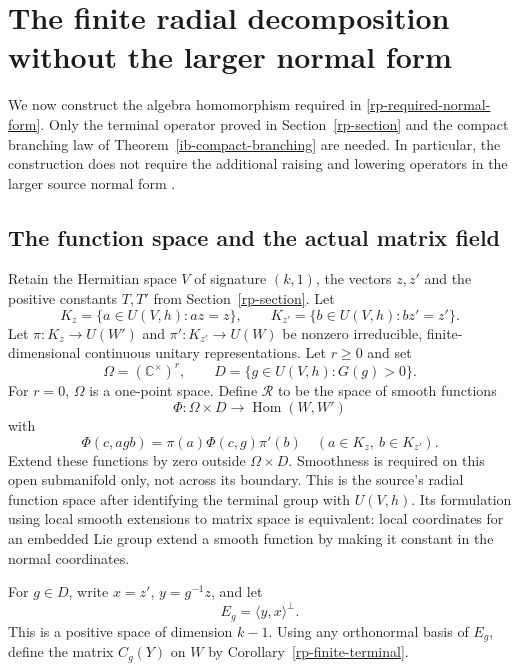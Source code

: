 \section{The finite radial decomposition without the larger normal form}
\label{rd-section}

We now construct the algebra homomorphism required in
\eqref{rp-required-normal-form}.  Only the terminal
operator proved in Section~\ref{rp-section} and the
compact branching law of Theorem~\ref{ib-compact-branching}
are needed.  In particular, the construction does not
require the additional raising and lowering operators
in the larger source normal form
\cite{alpo-uniform-source}.

\subsection{The function space and the actual matrix field}

Retain the Hermitian space $V$ of signature $(k,1)$,
the vectors $z,z'$ and the positive constants $T,T'$
from Section~\ref{rp-section}.  Let
\[
 K_z=\{a\in U(V,h):az=z\},\qquad
 K_{z'}=\{b\in U(V,h):bz'=z'\}.
\]
Let $\pi:K_z\to U(W')$ and
$\pi':K_{z'}\to U(W)$ be nonzero irreducible,
finite-dimensional continuous unitary representations.
Let $r\geq0$ and set
\[
 \Omega=(\mathbb C^\times)^r,\qquad
 D=\{g\in U(V,h):G(g)>0\}.
\]
For $r=0$, $\Omega$ is a one-point space.
Define $\mathscr R$ to be the space of smooth functions
\[
 \Phi:\Omega\times D\longrightarrow\operatorname{Hom}(W,W')
\]
with
\begin{equation}\label{rd-biequivariance}
 \Phi(c,agb)=\pi(a)\Phi(c,g)\pi'(b)
              \quad(a\in K_z,\ b\in K_{z'}).
\end{equation}
Extend these functions by zero outside $\Omega\times D$.
Smoothness is required on this open submanifold only,
not across its boundary.  This is the source's radial
function space after identifying the terminal group
with $U(V,h)$.  Its formulation using local smooth
extensions to matrix space is equivalent: local
coordinates for an embedded Lie group extend a smooth
function by making it constant in the normal
coordinates.

For $g\in D$, write $x=z'$, $y=g^{-1}z$, and let
\[
                       E_g=\langle y,x\rangle^\perp.
\]
This is a positive space of dimension $k-1$.
Using any orthonormal basis of $E_g$, define the
matrix $C_g(Y)$ on $W$ by
Corollary~\ref{rp-finite-terminal}.

